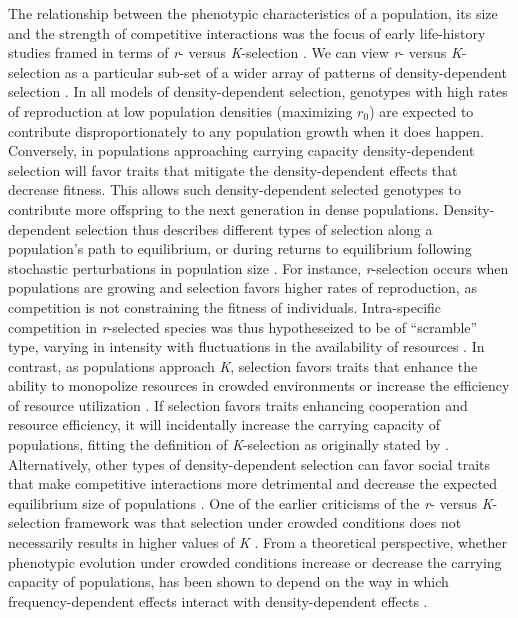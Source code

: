 \documentclass{article}
\begin{document}
 The relationship between the phenotypic characteristics of a population, its size and the strength of competitive interactions was the focus of early life-history studies framed in terms of \textit{r}- versus \textit{K}-selection \citep{macarthur1967theory}. We can view \textit{r}- versus \textit{K}-selection as a particular sub-set of a wider array of patterns of density-dependent selection \citep{Wright2018, Engen2020}. In all models of density-dependent selection, genotypes with high rates of reproduction at low population densities (maximizing $r_0$) are expected to contribute disproportionately to any population growth when it does happen. Conversely, in populations approaching carrying capacity density-dependent selection will favor traits that mitigate the density-dependent effects that decrease fitness. This allows such density-dependent selected genotypes to contribute more offspring to the next generation in dense populations. Density-dependent selection thus describes different types of selection along a population's path to equilibrium, or during returns to equilibrium following stochastic perturbations in population size \citep{Engen2013}. For instance, \textit{r}-selection occurs when populations are growing and selection favors higher rates of reproduction, as competition is not constraining the fitness of individuals. Intra-specific competition in \textit{r}-selected species was thus hypotheseized to be of “scramble” type, varying in intensity with fluctuations in the availability of resources \citep{Southwood1977}. In contrast, as populations approach \textit{K}, selection favors traits that enhance the ability to monopolize resources in crowded environments or increase the efficiency of resource utilization \citep{Boyce1984}. If selection favors traits enhancing cooperation and resource efficiency, it will incidentally increase the carrying capacity of populations, fitting the definition of \textit{K}-selection as originally stated by \cite{macarthur1967theory}. Alternatively, other types of density-dependent selection can favor social traits that make competitive interactions more detrimental and decrease the expected equilibrium size of populations \citep{Joshi2001, Engen2020}. One of the earlier criticisms of the \textit{r}- versus \textit{K}-selection framework was that selection under crowded conditions does not necessarily results in higher values of \textit{K} \citep{Boyce1984}. From a theoretical perspective, whether phenotypic evolution under crowded conditions increase or decrease the carrying capacity of populations, has been shown to depend on the way in which frequency-dependent effects interact with  density-dependent effects \citep{Engen2020}. 
\end{document}
